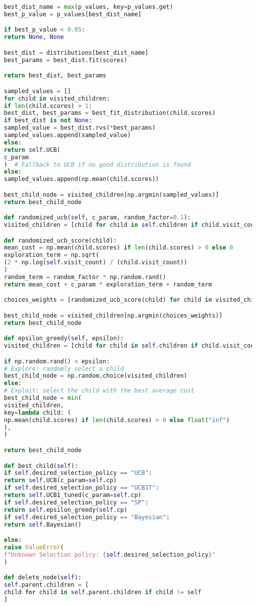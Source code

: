 \begin{lstlisting}[language = Python]
best_dist_name = max(p_values, key=p_values.get)
best_p_value = p_values[best_dist_name]

if best_p_value < 0.05:
return None, None

best_dist = distributions[best_dist_name]
best_params = best_dist.fit(scores)

return best_dist, best_params

sampled_values = []
for child in visited_children:
if len(child.scores) > 1:
best_dist, best_params = best_fit_distribution(child.scores)
if best_dist is not None:
sampled_value = best_dist.rvs(*best_params)
sampled_values.append(sampled_value)
else:
return self.UCB(
c_param
)  # Fallback to UCB if no good distribution is found
else:
sampled_values.append(np.mean(child.scores))

best_child_node = visited_children[np.argmin(sampled_values)]
return best_child_node

def randomized_ucb(self, c_param, random_factor=0.1):
visited_children = [child for child in self.children if child.visit_count > 0]

def randomized_ucb_score(child):
mean_cost = np.mean(child.scores) if len(child.scores) > 0 else 0
exploration_term = np.sqrt(
(2 * np.log(self.visit_count) / (child.visit_count))
)
random_term = random_factor * np.random.rand()
return mean_cost + c_param * exploration_term + random_term

choices_weights = [randomized_ucb_score(child) for child in visited_children]

best_child_node = visited_children[np.argmin(choices_weights)]
return best_child_node

def epsilon_greedy(self, epsilon):
visited_children = [child for child in self.children if child.visit_count > 0]

if np.random.rand() < epsilon:
# Explore: randomly select a child
best_child_node = np.random.choice(visited_children)
else:
# Exploit: select the child with the best average cost
best_child_node = min(
visited_children,
key=lambda child: (
np.mean(child.scores) if len(child.scores) > 0 else float("inf")
),
)

return best_child_node

def best_child(self):
if self.desired_selection_policy == "UCB":
return self.UCB(c_param=self.cp)
if self.desired_selection_policy == "UCB1T":
return self.UCB1_tuned(c_param=self.cp)
if self.desired_selection_policy == "SP":
return self.epsilon_greedy(self.cp)
if self.desired_selection_policy == "Bayesian":
return self.Bayesian()

else:
raise ValueError(
f"Unknown Selection policy: {self.desired_selection_policy}"
)

def delete_node(self):
self.parent.children = [
child for child in self.parent.children if child != self
]
\end{lstlisting}
\newpage
